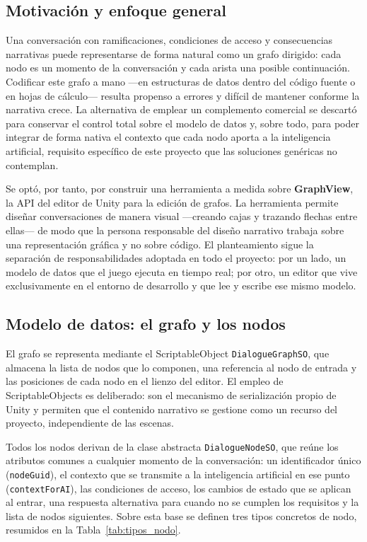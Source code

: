 \documentclass[12pt,twoside,titlepage]{report}
\begin{document}
\subsection{Motivación y enfoque general}

Una conversación con ramificaciones, condiciones de acceso y consecuencias narrativas puede representarse de forma natural como un grafo dirigido: cada nodo es un momento de la conversación y cada arista una posible continuación. Codificar este grafo a mano ---en estructuras de datos dentro del código fuente o en hojas de cálculo--- resulta propenso a errores y difícil de mantener conforme la narrativa crece. La alternativa de emplear un complemento comercial se descartó para conservar el control total sobre el modelo de datos y, sobre todo, para poder integrar de forma nativa el contexto que cada nodo aporta a la inteligencia artificial, requisito específico de este proyecto que las soluciones genéricas no contemplan.

Se optó, por tanto, por construir una herramienta a medida sobre \textbf{GraphView}, la API del editor de Unity para la edición de grafos. La herramienta permite diseñar conversaciones de manera visual ---creando cajas y trazando flechas entre ellas--- de modo que la persona responsable del diseño narrativo trabaja sobre una representación gráfica y no sobre código. El planteamiento sigue la separación de responsabilidades adoptada en todo el proyecto: por un lado, un modelo de datos que el juego ejecuta en tiempo real; por otro, un editor que vive exclusivamente en el entorno de desarrollo y que lee y escribe ese mismo modelo.

\subsection{Modelo de datos: el grafo y los nodos}

El grafo se representa mediante el ScriptableObject \texttt{DialogueGraphSO}, que almacena la lista de nodos que lo componen, una referencia al nodo de entrada y las posiciones de cada nodo en el lienzo del editor. El empleo de ScriptableObjects es deliberado: son el mecanismo de serialización propio de Unity y permiten que el contenido narrativo se gestione como un recurso del proyecto, independiente de las escenas.

Todos los nodos derivan de la clase abstracta \texttt{DialogueNodeSO}, que reúne los atributos comunes a cualquier momento de la conversación: un identificador único (\texttt{nodeGuid}), el contexto que se transmite a la inteligencia artificial en ese punto (\texttt{contextForAI}), las condiciones de acceso, los cambios de estado que se aplican al entrar, una respuesta alternativa para cuando no se cumplen los requisitos y la lista de nodos siguientes. Sobre esta base se definen tres tipos concretos de nodo, resumidos en la Tabla~\ref{tab:tipos_nodo}.
\end{document}
